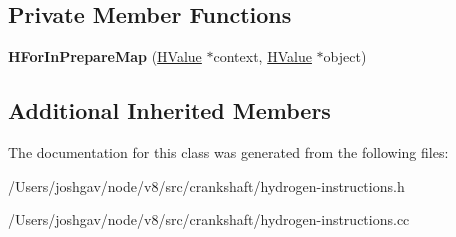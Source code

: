\subsection*{Private Member Functions}
\begin{DoxyCompactItemize}
\item 
{\bfseries H\+For\+In\+Prepare\+Map} (\hyperlink{classv8_1_1internal_1_1_h_value}{H\+Value} $\ast$context, \hyperlink{classv8_1_1internal_1_1_h_value}{H\+Value} $\ast$object)\hypertarget{classv8_1_1internal_1_1_h_for_in_prepare_map_a302fc59e38458a6143078d3366096c62}{}\label{classv8_1_1internal_1_1_h_for_in_prepare_map_a302fc59e38458a6143078d3366096c62}

\end{DoxyCompactItemize}
\subsection*{Additional Inherited Members}


The documentation for this class was generated from the following files\+:\begin{DoxyCompactItemize}
\item 
/\+Users/joshgav/node/v8/src/crankshaft/hydrogen-\/instructions.\+h\item 
/\+Users/joshgav/node/v8/src/crankshaft/hydrogen-\/instructions.\+cc\end{DoxyCompactItemize}
